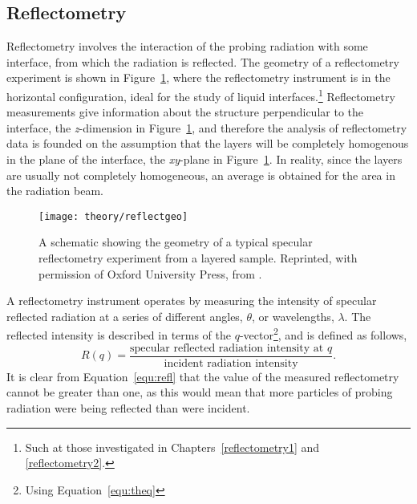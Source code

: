 \subsection{Reflectometry}
\label{sec:refltheory}

Reflectometry involves the interaction of the probing radiation with some interface, from which the radiation is reflected.
The geometry of a reflectometry experiment is shown in Figure~\ref{fig:refgeo}, where the reflectometry instrument is in the horizontal configuration, ideal for the study of liquid interfaces.\footnote{Such at those investigated in Chapters~\ref{reflectometry1} and \ref{reflectometry2}.}
Reflectometry measurements give information about the structure perpendicular to the interface, the \emph{z}-dimension in Figure~\ref{fig:refgeo}, and therefore the analysis of reflectometry data is founded on the assumption that the layers will be completely homogenous in the plane of the interface, the \emph{xy}-plane in Figure~\ref{fig:refgeo}.
In reality, since the layers are usually not completely homogeneous, an average is obtained for the area in the radiation beam.
%
\begin{figure}[t]
    \forcerectofloat
    \centering
    \texttt{[image: theory/reflectgeo]}
    \caption{A schematic showing the geometry of a typical specular reflectometry experiment from a layered sample. Reprinted, with permission of Oxford University Press, from \cite{sivia_elementary_2011}.}
    \label{fig:refgeo}
\end{figure}
%

A reflectometry instrument operates by measuring the intensity of specular reflected radiation at a series of different angles, $\theta$, or wavelengths, $\lambda$.
The reflected intensity is described in terms of the $q$-vector\footnote{Using Equation~\ref{equ:theq}}, and is defined as follows,
%
\begin{equation}
    R(q) = \frac{\text{specular reflected radiation intensity at }q}{\text{incident radiation intensity}}.
    \label{equ:refl}
\end{equation}
%
It is clear from Equation~\ref{equ:refl} that the value of the measured reflectometry cannot be greater than one, as this would mean that more particles of probing radiation were being reflected than were incident.

